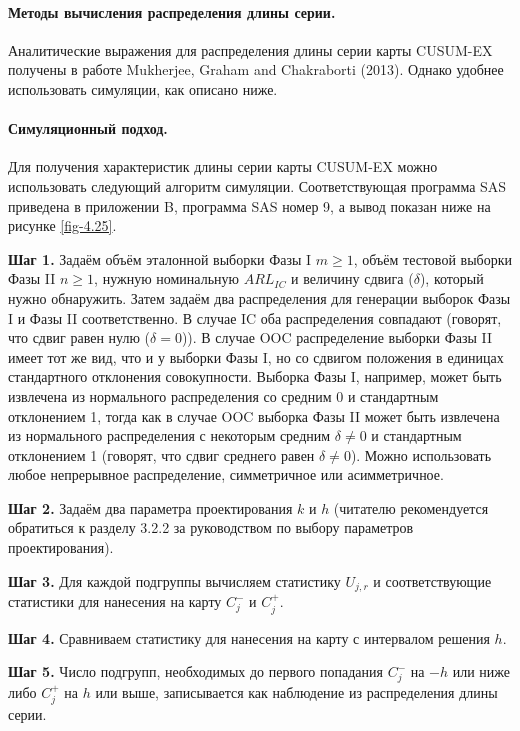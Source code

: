 \paragraph{Методы вычисления распределения длины серии.} Аналитические выражения для распределения длины серии карты CUSUM-EX получены в работе Mukherjee, Graham and Chakraborti (2013). Однако удобнее использовать симуляции, как описано ниже.

\paragraph{Симуляционный подход.} Для получения характеристик длины серии карты CUSUM-EX можно использовать следующий алгоритм симуляции. Соответствующая программа SAS приведена в приложении B, программа SAS номер 9, а вывод показан ниже на рисунке \ref{fig-4.25}.

\noindent\textbf{Шаг 1.} Задаём объём эталонной выборки Фазы I \(m \ge 1\), объём тестовой выборки Фазы II \(n \ge 1\), нужную номинальную \(ARL_{IC}\) и величину сдвига (\(\delta\)), который нужно обнаружить. Затем задаём два распределения для генерации выборок Фазы I и Фазы II соответственно. В случае IC оба распределения совпадают (говорят, что сдвиг равен нулю (\(\delta = 0\))). В случае OOC распределение выборки Фазы II имеет тот же вид, что и у выборки Фазы I, но со сдвигом положения в единицах стандартного отклонения совокупности. Выборка Фазы I, например, может быть извлечена из нормального распределения со средним 0 и стандартным отклонением 1, тогда как в случае OOC выборка Фазы II может быть извлечена из нормального распределения с некоторым средним \(\delta \ne 0\) и стандартным отклонением 1 (говорят, что сдвиг среднего равен \(\delta \ne 0\)). Можно использовать любое непрерывное распределение, симметричное или асимметричное.

\noindent\textbf{Шаг 2.} Задаём два параметра проектирования \(k\) и \(h\) (читателю рекомендуется обратиться к разделу 3.2.2 за руководством по выбору параметров проектирования).

\noindent\textbf{Шаг 3.} Для каждой подгруппы вычисляем статистику \(U_{j,r}\) и соответствующие статистики для нанесения на карту \(C_j^-\) и \(C_j^+\).

\noindent\textbf{Шаг 4.} Сравниваем статистику для нанесения на карту с интервалом решения \(h\).

\noindent\textbf{Шаг 5.} Число подгрупп, необходимых до первого попадания \(C_j^-\) на \(-h\) или ниже либо \(C_j^+\) на \(h\) или выше, записывается как наблюдение из распределения длины серии.

